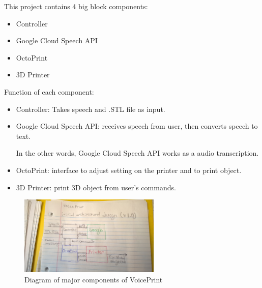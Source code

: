 This project contains 4 big block components:
\begin{itemize}
 
\item Controller 

\item Google Cloud Speech API

\item OctoPrint

\item 3D Printer

\end{itemize}

Function of each component:

\begin{itemize}

\item Controller: Takes speech and .STL file as input.

\item Google Cloud Speech API: receives speech from user, then converts speech to text. 

In the other words, Google Cloud Speech API works as a audio transcription.

\item OctoPrint: interface to adjust setting on the printer and to print object.

\item 3D Printer: print 3D object from user's commands.

\end{itemize}

\begin{figure}[h!]
	\centering
   	\includegraphics[width=0.6\textwidth]{images/Diagram.jpg}
   	    \caption{Diagram of major components of VoicePrint}

\end{figure}


